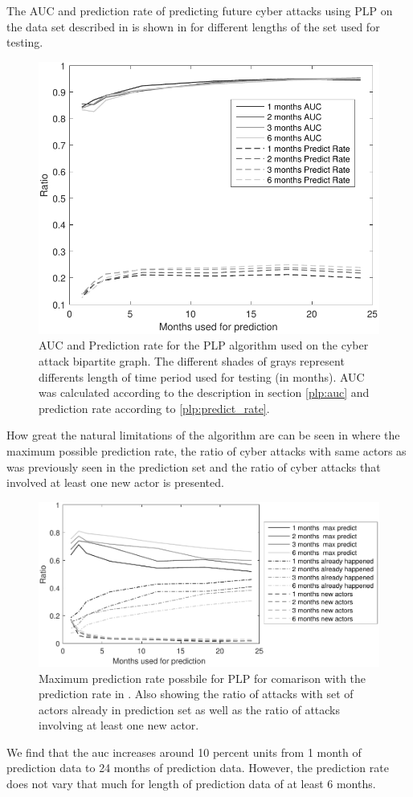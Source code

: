 The AUC and prediction rate of predicting future cyber attacks using PLP on the data set described in  is shown in  for different lengths of the set used for testing.
\begin{figure}[!ht]
\centering
\includegraphics[scale=0.9]{images/auc_plp_result.pdf}
\caption{\label{fig:plp_auc} AUC and Prediction rate for the PLP algorithm used on the cyber attack bipartite graph. The different shades of grays represent differents length of time period used for testing (in months). AUC was calculated according to the description in section \ref{plp:auc} and prediction rate according to \ref{plp:predict_rate}.}
\end{figure}

How great the natural limitations of the algorithm are can be seen in  where the maximum possible prediction rate, the ratio of cyber attacks with same actors as was previously seen in the prediction set and the ratio of cyber attacks that involved at least one new actor is presented.

\begin{figure}[!ht]
\centering
\includegraphics[width=\textwidth]{images/max_plp_result.pdf}
\caption{\label{fig:plp_max} 
Maximum prediction rate possbile for PLP for comarison with the prediction rate in . Also showing the ratio of attacks with set of actors already in prediction set as well as the ratio of attacks involving at least one new actor.}
\end{figure}

We find that the auc increases around 10 percent units from 1 month of prediction data to 24 months of prediction data. However, the prediction rate does not vary that much for length of prediction data of at least 6 months.
